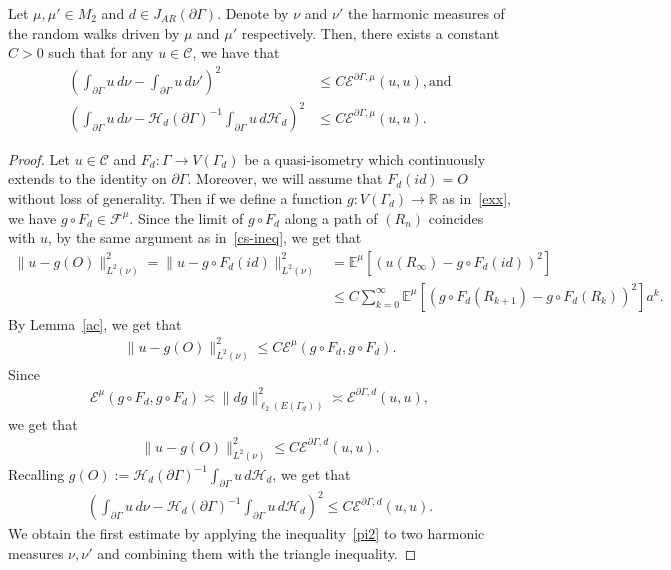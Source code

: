 \documentclass[AHL,Unicode,longabstracts,published]{cedram}
\newcommand{\ce}{\mathcal{E}}
\newcommand{\cf}{\mathcal{F}}
\newcommand{\ch}{\mathcal{H}}
\newcommand{\cC}{\mathcal{C}}
\newcommand{\br}{\mathbb{R}}
\newcommand{\be}{\mathbb{E}}
\begin{document}
\begin{prop}\label{pi}
Let $\mu,\mu'\in M_2$ and $d\in J_{AR}(\partial\Gamma)$. Denote by $\nu$ and $\nu'$ the harmonic measures of the random walks driven by $\mu$ and $\mu'$ respectively. Then, there exists a constant $C>0$ such that for any $u\in \cC$, we have that
\begin{align*}
\left(\int_{\partial\Gamma} u\, d\nu-\int_{\partial\Gamma} u\, d\nu'\right)^2&\leq C\ce^{\partial\Gamma,\mu}(u,u),\text{and}\\
\left(\int_{\partial\Gamma} u\, d\nu-\ch_{d}(\partial\Gamma)^{-1}\int_{\partial\Gamma} u\, d\ch_d\right)^2&\leq C\ce^{\partial\Gamma,\mu}(u,u).
\end{align*}
\end{prop}
\begin{proof}
Let $u\in\cC$ and $F_{d}:\Gamma\rightarrow V(\Gamma_{d})$ be a quasi-isometry which continuously extends to the identity on $\partial\Gamma$. Moreover, we will assume that $F_{d}(id)=O$ without loss of generality. Then if we define a function $g:V(\Gamma_{d})\to\br$ as in~\eqref{exx}, we have $g\circ F_{d}\in \cf^{\mu}$. Since the limit of $g\circ F_{d}$ along a path of $(R_n)$ coincides with $u$, by the same argument as in~\eqref{cs-ineq}, we get that
\begin{align*}
\|u-g(O)\|_{L^2(\nu)}^2=
\|u-g\circ F_{d}(id)\|_{L^2(\nu)}^2&=\be^{\mu}\left[\left(u(R_{\infty})- g\circ F_{d}(id)\right)^2\right]\\
&\leq C\sum_{k=0}^{\infty}\be^{\mu}\left[\left(g\circ F_{d}(R_{k+1})-g\circ F_{d}(R_k)\right)^2\right]a^k.
\end{align*}
By Lemma~\ref{ac}, we get that
\begin{align*}
\|u-g(O)\|_{L^2(\nu)}^2\leq C\ce^{\mu}(g\circ F_{d},g\circ F_{d}).
\end{align*}
Since
\begin{align*}
\ce^{\mu}(g\circ F_{d},g\circ F_{d})\asymp \|dg\|^2_{\ell_2(E(\Gamma_{d}))} \asymp \ce^{\partial\Gamma,d}(u,u),
\end{align*}
we get that
\begin{align}\label{pi; corrected}
\|u-g(O)\|_{L^2(\nu)}^2\leq C\ce^{\partial\Gamma,d}(u,u).
\end{align}
Recalling $g(O):=\ch_{d}(\partial\Gamma)^{-1}\int_{\partial\Gamma} u\, d\ch_d$, we get that
\begin{align}\label{pi2}
\left(\int_{\partial\Gamma} u\, d\nu-\ch_{d}(\partial\Gamma)^{-1}\int_{\partial\Gamma} u\, d\ch_d\right)^2\leq C\ce^{\partial\Gamma,d}(u,u).
\end{align}
We obtain the first estimate by applying the inequality~\eqref{pi2} to two harmonic measures $\nu,\nu'$ and combining them with the triangle inequality.
\end{proof}
\end{document}

